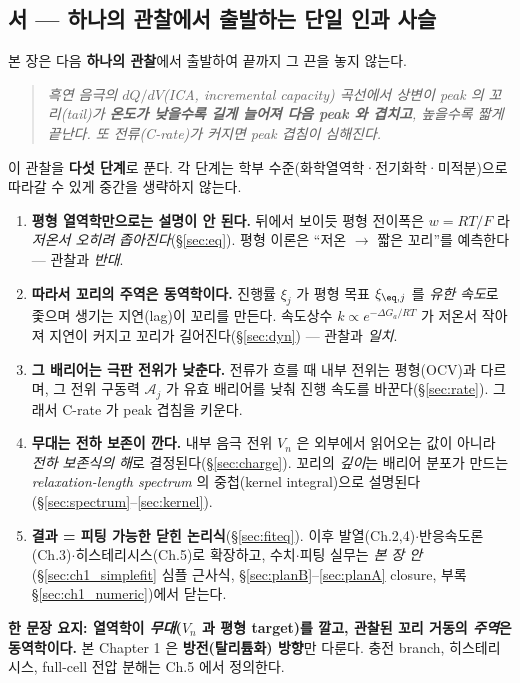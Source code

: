 \subsection*{서 — 하나의 관찰에서 출발하는 단일 인과 사슬}
본 장은 다음 \textbf{하나의 관찰}에서 출발하여 끝까지 그 끈을 놓지 않는다.
\begin{quote}\itshape
흑연 음극의 $dQ/dV$(ICA, incremental capacity) 곡선에서 상변이 peak 의 꼬리(tail)가 \textbf{온도가
낮을수록 길게 늘어져 다음 peak 와 겹치고}, 높을수록 짧게 끝난다. 또 전류(C-rate)가 커지면 peak 겹침이
심해진다.
\end{quote}
이 관찰을 \textbf{다섯 단계}로 푼다. 각 단계는 학부 수준(화학열역학·전기화학·미적분)으로 따라갈 수 있게
중간을 생략하지 않는다.
\begin{enumerate}[label=\textbf{(\arabic*)},leftmargin=2.2em]
\item \textbf{평형 열역학만으로는 설명이 안 된다.} 뒤에서 보이듯 평형 전이폭은 $w=RT/F$ 라 \emph{저온서
  오히려 좁아진다}(\S\ref{sec:eq}). 평형 이론은 ``저온 $\to$ 짧은 꼬리''를 예측한다 — 관찰과 \emph{반대}.
\item \textbf{따라서 꼬리의 주역은 동역학이다.} 진행률 $\xi_j$ 가 평형 목표 $\xi_{\eq,j}$ 를 \emph{유한
  속도}로 좇으며 생기는 지연(lag)이 꼬리를 만든다. 속도상수 $k\propto e^{-\Delta G_a/RT}$ 가 저온서
  작아져 지연이 커지고 꼬리가 길어진다(\S\ref{sec:dyn}) — 관찰과 \emph{일치}.
\item \textbf{그 배리어는 극판 전위가 낮춘다.} 전류가 흐를 때 내부 전위는 평형(OCV)과 다르며, 그 전위
  구동력 $\mathcal A_j$ 가 유효 배리어를 낮춰 진행 속도를 바꾼다(\S\ref{sec:rate}). 그래서 C-rate 가
  peak 겹침을 키운다.
\item \textbf{무대는 전하 보존이 깐다.} 내부 음극 전위 $V_n$ 은 외부에서 읽어오는 값이 아니라 \emph{전하
  보존식의 해}로 결정된다(\S\ref{sec:charge}). 꼬리의 \emph{깊이}는 배리어 분포가 만드는
  \emph{relaxation-length spectrum} 의 중첩(kernel integral)으로 설명된다(\S\ref{sec:spectrum}--\ref{sec:kernel}).
\item \textbf{결과 = 피팅 가능한 닫힌 논리식}(\S\ref{sec:fiteq}). 이후 발열(Ch.2,4)$\cdot$반응속도론
  (Ch.3)$\cdot$히스테리시스(Ch.5)로 확장하고, 수치$\cdot$피팅 실무는 \emph{본 장 안}(\S\ref{sec:ch1_simplefit} 심플
근사식, \S\ref{sec:planB}--\ref{sec:planA} closure, 부록 \S\ref{sec:ch1_numeric})에서 닫는다.
\end{enumerate}
\noindent\textbf{한 문장 요지: 열역학이 \emph{무대}($V_n$ 과 평형 target)를 깔고, 관찰된 꼬리 거동의
\emph{주역}은 동역학이다.} 본 Chapter 1 은 \textbf{방전(탈리튬화) 방향}만 다룬다. 충전 branch,
히스테리시스, full-cell 전압 분해는 Ch.5 에서 정의한다.

